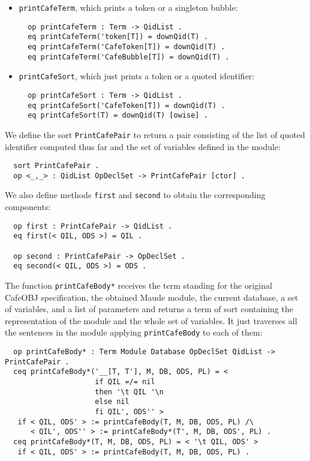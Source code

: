 \begin{itemize}
\item
\verb"printCafeTerm", which prints a token or a singleton bubble:

{\codesize
\begin{verbatim}
  op printCafeTerm : Term -> QidList .
  eq printCafeTerm('token[T]) = downQid(T) .
  eq printCafeTerm('CafeToken[T]) = downQid(T) .
  eq printCafeTerm('CafeBubble[T]) = downQid(T) .
\end{verbatim}
}

\item
\verb"printCafeSort", which just prints a token or a quoted identifier:

{\codesize
\begin{verbatim}
  op printCafeSort : Term -> QidList .
  eq printCafeSort('CafeToken[T]) = downQid(T) .
  eq printCafeSort(T) = downQid(T) [owise] .
\end{verbatim}
}

\end{itemize}

We define the sort \verb"PrintCafePair" to return a pair consisting of
the list of quoted identifier computed thus far and the set of variables
defined in the module:

{\codesize
\begin{verbatim}
  sort PrintCafePair .
  op <_,_> : QidList OpDeclSet -> PrintCafePair [ctor] .
\end{verbatim}
}

We also define methods \verb"first" and \verb"second" to obtain the
corresponding components:

{\codesize
\begin{verbatim}
  op first : PrintCafePair -> QidList .
  eq first(< QIL, ODS >) = QIL .

  op second : PrintCafePair -> OpDeclSet .
  eq second(< QIL, ODS >) = ODS .
\end{verbatim}
}

The function \verb"printCafeBody*" receives the term standing for the original
CafeOBJ specification, the obtained Maude module, the current database, a set of
variables, and a list of parameters and returns a term of sort containing the
representation of the module and the whole set of variables. It just traverses
all the sentences in the module applying \texttt{printCafeBody} to each of them:

{\codesize
\begin{verbatim}
  op printCafeBody* : Term Module Database OpDeclSet QidList -> PrintCafePair .
  ceq printCafeBody*('__[T, T'], M, DB, ODS, PL) = <
                     if QIL =/= nil
                     then '\t QIL '\n
                     else nil
                     fi QIL', ODS'' >
   if < QIL, ODS' > := printCafeBody(T, M, DB, ODS, PL) /\
      < QIL', ODS'' > := printCafeBody*(T', M, DB, ODS', PL) .
  ceq printCafeBody*(T, M, DB, ODS, PL) = < '\t QIL, ODS' >
   if < QIL, ODS' > := printCafeBody(T, M, DB, ODS, PL) .
\end{verbatim}
}

